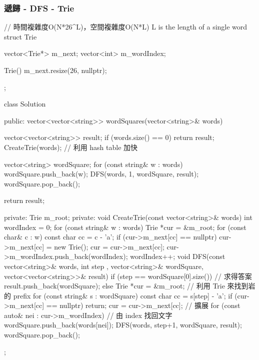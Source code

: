 \subsubsection{遞歸 - DFS - Trie}
\begin{Code}
// 時間複雜度O(N*26^L)，空間複雜度O(N*L) L is the length of a single word
struct Trie
{
    vector<Trie*> m_next;
    vector<int> m_wordIndex;

    Trie() { m_next.resize(26, nullptr); }
};

class Solution {
public:
    vector<vector<string>> wordSquares(vector<string>& words) {
        vector<vector<string>> result;
        if (words.size() == 0) return result;
        CreateTrie(words); // 利用 hash table 加快


        vector<string> wordSquare;
        for (const string& w : words)
        {
            wordSquare.push_back(w);
            DFS(words, 1, wordSquare, result);
            wordSquare.pop_back();
        }

        return result;
    }
private:
    Trie m_root;
private:
    void CreateTrie(const vector<string>& words)
    {
        int wordIndex = 0;
        for (const string& w : words)
        {
            Trie *cur = &m_root;
            for (const char& c : w)
            {
                const char cc = c - 'a';
                if (cur->m_next[cc] == nullptr)
                    cur->m_next[cc] = new Trie();
                cur = cur->m_next[cc];
                cur->m_wordIndex.push_back(wordIndex);
            }
            wordIndex++;
        }
    }
    void DFS(const vector<string>& words, int step
             , vector<string>& wordSquare, vector<vector<string>>& result)
    {
        if (step == wordSquare[0].size())
        {
            // 求得答案
            result.push_back(wordSquare);
        }
        else
        {
            Trie *cur = &m_root;
            // 利用 Trie 來找到岩的 prefix
            for (const string& s : wordSquare)
            {
                const char cc = s[step] - 'a';
                if (cur->m_next[cc] == nullptr) return;
                cur = cur->m_next[cc];
            }
            // 擴展
            for (const auto& nei : cur->m_wordIndex)
            {
                // 由 index 找回文字
                wordSquare.push_back(words[nei]);
                DFS(words, step+1, wordSquare, result);
                wordSquare.pop_back();
            }
        }
    }
};
\end{Code}
